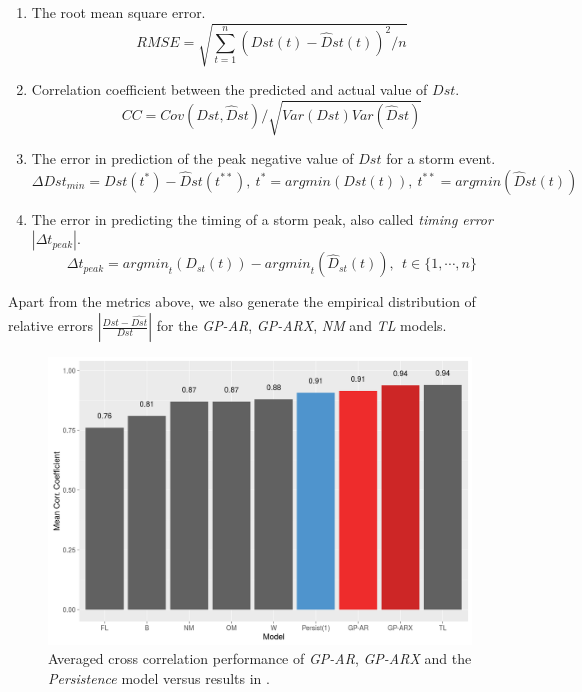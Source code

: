 \documentclass[referee,a4paper,12pt,traditabstract]{swsc}
\begin{document}
\begin{linenumbers}
\begin{enumerate}
    \item The root mean square error.
    \begin{equation}
        RMSE = \sqrt{\sum_{t=1}^{n} (Dst(t) - \hat{D}st(t))^2 / n}
    \end{equation}
    \item Correlation coefficient between the predicted and actual value of $Dst$.
    \begin{equation}
        CC = Cov(Dst, \hat{D}st)/\sqrt{Var(Dst) Var(\hat{D}st)}
    \end{equation}
    \item The error in prediction of the peak negative value of $Dst$ for a storm event.
    \begin{equation}
        \Delta Dst_{min} = Dst(t^*) - \hat{D}st(t^{**}), \ t^* = argmin(Dst(t)),\ t^{**} = argmin(\hat{D}st(t))
    \end{equation}
    \item The error in predicting the timing of a storm peak, also called \emph{timing error} $|\Delta t_{peak}|$.
    \begin{equation}
        \Delta t_{peak} = \mathit{argmin}_{t}(D_{st}(t)) - \mathit{argmin}_t(\hat{D}_{st}(t)), \ \ t \in \{1, \cdots, n\}
    \end{equation}
\end{enumerate}

Apart from the metrics above, we also generate the empirical distribution of relative errors $|\frac{Dst - \hat{Dst}}{Dst}|$ for the \emph{GP-AR}, \emph{GP-ARX}, \emph{NM} and \emph{TL} models.


\begin{figure}
   \centering
   \includegraphics[width=\textwidth]{Compare_CC.png}
      \caption{Averaged cross correlation performance of \emph{GP-AR}, \emph{GP-ARX} and the \emph{Persistence} model versus results in \citet{Ji2012}.}
         \label{fig:cc}
\end{figure}


\end{linenumbers}
\end{document}
